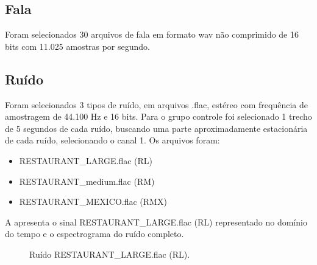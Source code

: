 \subsection{Fala}
Foram selecionados 30 arquivos de fala em formato wav não comprimido de 16 bits com 11.025 amostras por segundo.
\subsection{Ruído}
Foram selecionados 3 tipos de ruído, em arquivos .flac, estéreo com frequência de amostragem de 44.100 Hz e 16 bits. Para o grupo controle foi selecionado 1 trecho de 5 segundos de cada ruído, buscando uma parte aproximadamente estacionária de cada ruído, selecionando o canal 1. Os arquivos foram:
\begin{itemize}
    \item RESTAURANT\_LARGE.flac (RL)
    \item RESTAURANT\_medium.flac (RM)
    \item RESTAURANT\_MEXICO.flac (RMX)
\end{itemize}

A  apresenta o sinal RESTAURANT\_LARGE.flac (RL) representado no domínio do tempo e o espectrograma do ruído completo. 

\begin{figure}[H]
\quad
{}
\caption{Ruído RESTAURANT\_LARGE.flac (RL).}
\label{ruidos1}
\end{figure}


